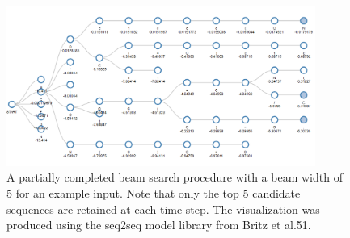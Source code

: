 \begin{figure}
  \centering
  \includegraphics[width=0.9\textwidth]{Images/ret_beam_search.png}
  \caption{A partially completed beam search procedure with a beam width of 5 for an example input. Note that only the top 5 candidate sequences are retained at each time step. The visualization was produced using the seq2seq model library from Britz et al.51.}
  \label{fig:ret_beam_search}
\end{figure}


